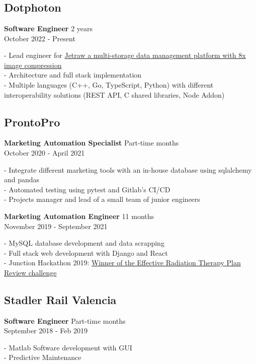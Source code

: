 \section*{\faBriefcase} \label{sec:experience}
 {}

\subsection{Dotphoton}
\textbf{Software Engineer} \hfill 2 years \\
{\footnotesize October 2022 - Present} \\
{
    \raggedright
    - Lead engineer for \href{https://www.dotphoton.com/products/jetraw}{Jetraw 
    a multi-storage data management platform with 8x image compression} \\
    - Architecture and full stack implementation \\
    - Multiple languages (C++, Go, TypeScript, Python) with different
    interoperability solutions (REST API, C shared libraries, Node Addon) \\
}

\medskip
\subsection{ProntoPro}
\textbf{Marketing Automation Specialist} \hfill Part-time  months \\ 
{\footnotesize October 2020 - April 2021} \\
{
    \raggedright
    - Integrate different marketing tools with an in-house database using
    sqlalchemy and pandas \\
    - Automated testing using pytest and Gitlab's CI/CD \\
    - Projects manager and lead of a small team of junior engineers \\
}

\textbf{Marketing Automation Engineer} \hfill 11 months \\ 
{\footnotesize November 2019 - September 2021} \\
{
    \raggedright
    - MySQL database development and data scrapping \\
    - Full stack web development with Django and React \\
    - Junction Hackathon 2019:
    \href{http://www.upv.es/noticias-upv/noticia-11673-makers-upv-tri-es.html}{Winner
    of the Effective Radiation Therapy Plan Review challenge}\\
}

\medskip
\subsection{Stadler Rail Valencia}
\textbf{Software Engineer} \hfill Part-time  months \\ 
{\footnotesize September 2018 - Feb 2019} \\
{
    \raggedright
    - Matlab Software development with GUI \\
    - Predictive Maintenance \\
}